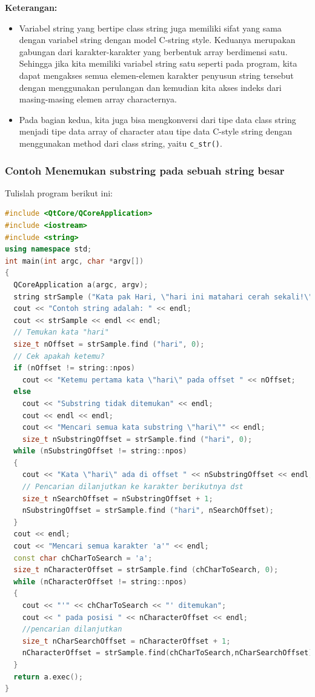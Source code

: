 \textbf{Keterangan:}

\begin{itemize}

\item
  Variabel string yang bertipe class string juga memiliki sifat yang
  sama dengan variabel string dengan model C-string style. Keduanya
  merupakan gabungan dari karakter-karakter yang berbentuk array
  berdimensi satu. Sehingga jika kita memiliki variabel string satu
  seperti pada program, kita dapat mengakses semua elemen-elemen
  karakter penyusun string tersebut dengan menggunakan perulangan dan
  kemudian kita akses indeks dari masing-masing elemen array
  characternya.
\item
  Pada bagian kedua, kita juga bisa mengkonversi dari tipe data class
  string menjadi tipe data array of character atau tipe data C-style
  string dengan menggunakan method dari class string, yaitu
  \texttt{c\_str()}.
\end{itemize}

\subsubsection*{Contoh  Menemukan substring pada sebuah string besar}

Tulislah program berikut ini:

\begin{lstlisting}[language=c++, caption=Menemukan substring pada sebuah string besar, label=contoh3-28]
#include <QtCore/QCoreApplication>
#include <iostream>
#include <string>
using namespace std;
int main(int argc, char *argv[])
{
  QCoreApplication a(argc, argv);
  string strSample ("Kata pak Hari, \"hari ini matahari cerah sekali!\"");
  cout << "Contoh string adalah: " << endl;
  cout << strSample << endl << endl;
  // Temukan kata "hari"
  size_t nOffset = strSample.find ("hari", 0);
  // Cek apakah ketemu?
  if (nOffset != string::npos)
    cout << "Ketemu pertama kata \"hari\" pada offset " << nOffset;
  else
    cout << "Substring tidak ditemukan" << endl;
    cout << endl << endl;
    cout << "Mencari semua kata substring \"hari\"" << endl;
    size_t nSubstringOffset = strSample.find ("hari", 0);
  while (nSubstringOffset != string::npos)
  {
    cout << "Kata \"hari\" ada di offset " << nSubstringOffset << endl;
    // Pencarian dilanjutkan ke karakter berikutnya dst
    size_t nSearchOffset = nSubstringOffset + 1;
    nSubstringOffset = strSample.find ("hari", nSearchOffset);
  }
  cout << endl;
  cout << "Mencari semua karakter 'a'" << endl;
  const char chCharToSearch = 'a';
  size_t nCharacterOffset = strSample.find (chCharToSearch, 0);
  while (nCharacterOffset != string::npos)
  {
    cout << "'" << chCharToSearch << "' ditemukan";
    cout << " pada posisi " << nCharacterOffset << endl;
    //pencarian dilanjutkan
    size_t nCharSearchOffset = nCharacterOffset + 1;
    nCharacterOffset = strSample.find(chCharToSearch,nCharSearchOffset);
  }
  return a.exec();
}
\end{lstlisting}


